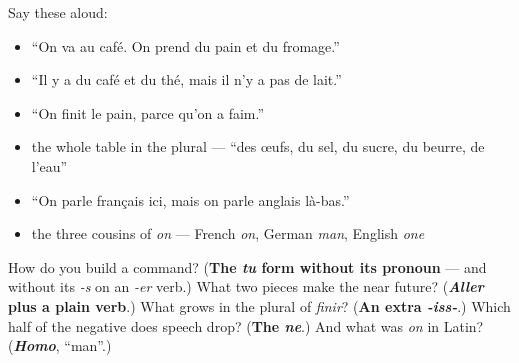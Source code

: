 Say these aloud:

\begin{itemize}
\raggedright
  \item \textquotedblleft{}On va au café. On prend du pain et du fromage.\textquotedblright{}
  \item \textquotedblleft{}Il y a du café et du thé, mais il n'y a pas de lait.\textquotedblright{}
  \item \textquotedblleft{}On finit le pain, parce qu'on a faim.\textquotedblright{}
  \item the whole table in the plural — \textquotedblleft{}des œufs, du sel, du sucre, du beurre, de l'eau\textquotedblright{}
  \item \textquotedblleft{}On parle français ici, mais on parle anglais là-bas.\textquotedblright{}
  \item the three cousins of \emph{on} — French \emph{on}, German \emph{man}, English \emph{one}
\end{itemize}

\begin{tcolorbox}[breakable,colback=teal!4,colframe=teal!35!black,title={Before you move on}]
How do you build a command? (\textbf{The \emph{tu} form without its pronoun} — and without its \emph{-s} on an \emph{-er} verb.) What two pieces make the near future? (\emph{\textbf{Aller}} \textbf{plus a plain verb}.) What grows in the plural of \emph{finir}? (\textbf{An extra \emph{-iss-}}.) Which half of the negative does speech drop? (\textbf{The \emph{ne}}.) And what was \emph{on} in Latin? (\emph{\textbf{Homo}}, \textquotedblleft{}man\textquotedblright{}.)
\end{tcolorbox}
